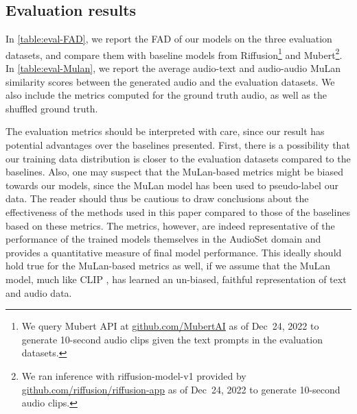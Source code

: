 \documentclass[nohyperref]{article}
\theoremstyle{plain}
\theoremstyle{definition}
\theoremstyle{remark}
\begin{document}
\subsection{Evaluation results}
In \cref{table:eval-FAD}, we report the FAD of our models on the three evaluation datasets, and compare them with baseline models from Riffusion\footnote{We query Mubert API at \href{https://github.com/MubertAI}{github.com/MubertAI} as of Dec~24, 2022 to generate 10-second audio clips given the text prompts in the evaluation datasets.} and Mubert\footnote{We ran inference with riffusion-model-v1 provided by \href{https://github.com/riffusion/riffusion-app}{github.com/riffusion/riffusion-app} as of Dec~24, 2022 to generate 10-second audio clips.}. 
In \cref{table:eval-Mulan}, we report the average audio-text and audio-audio MuLan similarity scores between the generated audio and the evaluation datasets. We also include the metrics computed for the ground truth audio, as well as the shuffled ground truth.

The evaluation metrics should be interpreted with care, since our result has potential advantages over the baselines presented. First, there is a possibility that our training data distribution is closer to the evaluation datasets compared to the baselines. Also, one may suspect that the MuLan-based metrics might be biased towards our models, since the MuLan model has been used to pseudo-label our data. The reader should thus be cautious to draw conclusions about the effectiveness of the methods used in this paper compared to those of the baselines based on these metrics. The metrics, however, are indeed representative of the performance of the trained models themselves in the AudioSet domain and provides a quantitative measure of final model performance. This ideally should hold true for the MuLan-based metrics as well, if we assume that the MuLan model, much like CLIP \cite{radford2021learning}, has learned an un-biased, faithful representation of text and audio data.
\end{document}
